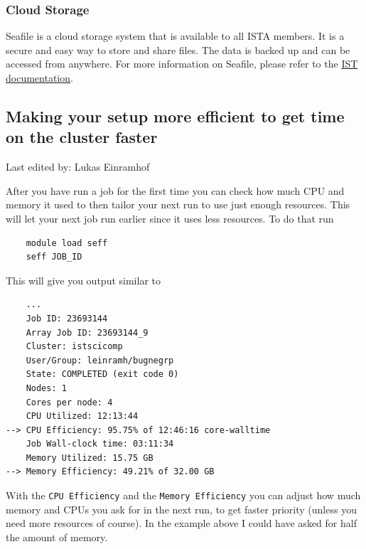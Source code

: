 \documentclass{article}
\newcommand{\setlasteditor}[1]{\gdef\lasteditor{#1}}
\newcommand{\lastedited}{%
    \vspace{1mm} {\footnotesize Last edited by: \lasteditor} \vspace{3mm}
    \newline

}
\begin{document}
\subsubsection{Cloud Storage}
Seafile is a cloud storage system that is available to all ISTA members. It is a secure and easy way to store and share files. The data is backed up and can be accessed from anywhere. For more information on Seafile, please refer to the \href{https://it.pages.ist.ac.at/how-to-safely-share-data/}{IST documentation}.

\subsection{Making your setup more efficient to get time on the cluster faster}
\setlasteditor{Lukas Einramhof}
\lastedited
\noindent
After you have run a job for the first time you can check how much CPU and memory it used to then tailor your next run to use just enough resources. This will let your next job run earlier since it uses less resources.
To do that run
\begin{verbatim}
    module load seff
    seff JOB_ID
\end{verbatim}
This will give you output similar to
\begin{verbatim}
    ...
    Job ID: 23693144
    Array Job ID: 23693144_9
    Cluster: istscicomp
    User/Group: leinramh/bugnegrp
    State: COMPLETED (exit code 0)
    Nodes: 1
    Cores per node: 4
    CPU Utilized: 12:13:44
--> CPU Efficiency: 95.75% of 12:46:16 core-walltime
    Job Wall-clock time: 03:11:34
    Memory Utilized: 15.75 GB
--> Memory Efficiency: 49.21% of 32.00 GB
\end{verbatim}
With the \texttt{CPU Efficiency} and the \texttt{Memory Efficiency} you can adjust how much memory and CPUs you ask for in the next run, to get faster priority (unless you need more resources of course).
In the example above I could have asked for half the amount of memory.
\end{document}
